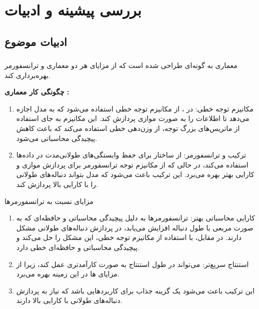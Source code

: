 
\chapter{بررسی پیشینه و ادبیات}
\section{ادبیات موضوع}
\subsection{}

معماری  \cite{RWKV} به گونه‌ای طراحی شده است که از مزایای هر دو معماری   \cite{1808.03314} و ترانسفورمر \cite{1706.03762}  بهره‌برداری کند.

\textbf{چگونگی کار معماری :}
\begin{enumerate}
  \item  مکانیزم توجه خطی: در ، از مکانیزم توجه خطی استفاده می‌شود که به مدل اجازه می‌دهد تا اطلاعات را به صورت موازی پردازش کند. این مکانیزم به جای استفاده از ماتریس‌های بزرگ توجه، از وزن‌دهی خطی استفاده می‌کند که باعث کاهش پیچیدگی محاسباتی می‌شود.
  \item ترکیب  و ترانسفورمر:  از ساختار  برای حفظ وابستگی‌های طولانی‌مدت در داده‌ها استفاده می‌کند، در حالی که از مکانیزم توجه ترانسفورمر برای پردازش موازی و کارایی بهتر بهره می‌برد. این ترکیب باعث می‌شود که مدل بتواند دنباله‌های طولانی را با کارایی بالا پردازش کند.
\end{enumerate}

مزایای  نسبت به ترانسفورمرها
\begin{enumerate}
  \item   کارایی محاسباتی بهتر: ترانسفورمرها به دلیل پیچیدگی محاسباتی و حافظه‌ای که به صورت مربعی با طول دنباله افزایش می‌یابد، در پردازش دنباله‌های طولانی مشکل دارند. در مقابل،  با استفاده از مکانیزم توجه خطی، این مشکل را حل می‌کند و پیچیدگی محاسباتی و حافظه‌ای خطی دارد.
  \item استنتاج سریع‌تر:  می‌تواند در طول استنتاج به صورت کارآمدتری عمل کند، زیرا از مزایای ها در این زمینه بهره می‌برد.
  \item این ترکیب باعث می‌شود  یک گزینه جذاب برای کاربردهایی باشد که نیاز به پردازش دنباله‌های طولانی با کارایی بالا دارند.
\end{enumerate}

